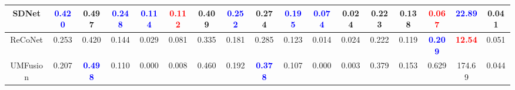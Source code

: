 \documentclass[sigconf]{acmart}
\begin{document}
\begin{table*}[htb]
{\begin{tabular}{c|ccccccc|cccccc|ccc}
		
			SDNet	 & \multicolumn{1}{c|}{\textcolor{blue}{\textbf{0.420}}} & \multicolumn{1}{c|}{0.497}  & \multicolumn{1}{c|}{\textcolor{blue}{\textbf{0.248}}}   & \multicolumn{1}{c|}{\textcolor{blue}{\textbf{0.114}}}   & \multicolumn{1}{c|}{\textcolor{red}{\textbf{0.112}}} & \multicolumn{1}{c|}{0.409} &\textcolor{blue}{\textbf{0.252}}  & \multicolumn{1}{c|}{0.274} & \multicolumn{1}{c|}{\textcolor{blue}{\textbf{0.195}}} & \multicolumn{1}{c|}{\textcolor{blue}{\textbf{0.074}}} & \multicolumn{1}{c|}{0.024}  & \multicolumn{1}{c|}{0.223} & \multicolumn{1}{c|}{0.138} & \multicolumn{1}{c|}{\textcolor{red}{\textbf{0.067}}}& \multicolumn{1}{c|}{\textcolor{blue}{\textbf{22.89}}}& \multicolumn{1}{c}{0.041}\\ \hline
						
			ReCoNet	 & \multicolumn{1}{c|}{0.253} & \multicolumn{1}{c|}{0.420}  & \multicolumn{1}{c|}{0.144}   & \multicolumn{1}{c|}{0.029}   & \multicolumn{1}{c|}{0.081} & \multicolumn{1}{c|}{0.335} & {0.181}  & \multicolumn{1}{c|}{0.285} & \multicolumn{1}{c|}{0.123} & \multicolumn{1}{c|}{0.014} & \multicolumn{1}{c|}{0.024}  & \multicolumn{1}{c|}{0.222} & \multicolumn{1}{c|}{0.119} & \multicolumn{1}{c|}{\textcolor{blue}{\textbf{0.209}}}& \multicolumn{1}{c|}{\textcolor{red}{\textbf{12.54}}}& \multicolumn{1}{c}{0.051}\\ \hline
			
			UMFusion	 & \multicolumn{1}{c|}{0.207} & \multicolumn{1}{c|}{\textcolor{blue}{\textbf{0.498}}}  & \multicolumn{1}{c|}{0.110}   & \multicolumn{1}{c|}{0.000}   & \multicolumn{1}{c|}{0.008} & \multicolumn{1}{c|}{0.460} & 0.192  & \multicolumn{1}{c|}{\textcolor{blue}{\textbf{0.378}}} & \multicolumn{1}{c|}{0.107} & \multicolumn{1}{c|}{0.000} & \multicolumn{1}{c|}{0.003}  & \multicolumn{1}{c|}{0.379} & \multicolumn{1}{c|}{0.153} & \multicolumn{1}{c|}{0.629}& \multicolumn{1}{c|}{174.69}& \multicolumn{1}{c}{0.044}\\ \hline
			

\end{tabular}}
\end{table*}
\end{document}
